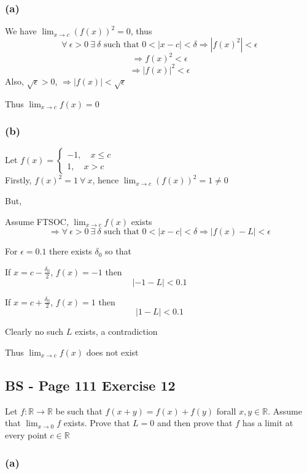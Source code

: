 \documentclass{article}
\begin{document}
\subsubsection*{(a)}
We have \(\lim_{x\to c}{(f(x))^2} = 0\), thus
\[
\forall \ \epsilon > 0 \ \exists \ \delta \text{ such that } 0 < |x-c| < \delta \Rightarrow |f(x)^2| < \epsilon 
\]
\[
\Rightarrow f(x)^2 < \epsilon 
\]
\[
\Rightarrow |f(x)|^2 < \epsilon 
\]
Also, \(\sqrt{\epsilon} > 0\), \(\Rightarrow |f(x)| < \sqrt{\epsilon} \)

Thus \(\lim_{x\to c}{f(x)} = 0\)

\subsubsection*{(b)}
Let \(f(x) = \begin{cases}
    -1, \quad x \leq c \\
    1, \quad x > c
\end{cases}\)
\\

Firstly, \(f(x)^2 = 1 \ \forall \ x\), hence \(\lim_{x\to c}{(f(x))^2} = 1 \neq 0\)

But,

Assume FTSOC, \(\lim_{x\to c}{f(x)}\) exists
\[
\Rightarrow \forall \ \epsilon > 0 \ \exists \ \delta \text{ such that } 0 < |x - c| < \delta \Rightarrow |f(x) - L| < \epsilon 
\]

For \(\epsilon = 0.1\) there exists \(\delta_0\) so that

If \(x = c - \frac{\delta_0}{2}\), \(f(x) = -1\) then
\[
|-1 - L| < 0.1
\]

If \( x = c + \frac{\delta_0}{2}\), \(f(x) = 1\) then
\[
|1- L| < 0.1
\]

Clearly no such \(L\) exists, a contradiction

Thus \(\lim_{x\to c}{f(x)}\) does not exist



\subsection*{BS - Page 111 Exercise 12}
Let \(f: \mathbb{R} \rightarrow \mathbb{R}\) be such that \(f(x+y) = f(x) + f(y)\) forall
\(x,y \in \mathbb{R}\). Assume that \(\lim_{x\to 0}{f}\) exists. Prove that \(L=0\) and 
then prove that \(f\) has a limit at every point \(c \in \mathbb{R}\)

\subsubsection*{(a)}
\end{document}

